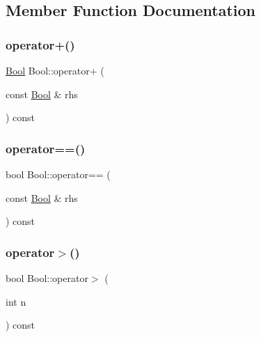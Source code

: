 \subsection{Member Function Documentation}
\mbox{\label{structBool_a6f4ecdec19082e896cffce66e6b6e7cc}} 
\subsubsection{\texorpdfstring{operator+()}{operator+()}}
{\footnotesize\ttfamily \mbox{\hyperlink{structBool}{Bool}} Bool\+::operator+ (\begin{DoxyParamCaption}\item[{const \mbox{\hyperlink{structBool}{Bool}} \&}]{rhs }\end{DoxyParamCaption}) const\hspace{0.3cm}{\ttfamily [inline]}}

\mbox{\label{structBool_afe799a4977c5ebe4c215d5d4ebd77adb}} 
\subsubsection{\texorpdfstring{operator==()}{operator==()}}
{\footnotesize\ttfamily bool Bool\+::operator== (\begin{DoxyParamCaption}\item[{const \mbox{\hyperlink{structBool}{Bool}} \&}]{rhs }\end{DoxyParamCaption}) const\hspace{0.3cm}{\ttfamily [inline]}}

\mbox{\label{structBool_a7baecbc58992eb06157fbbbaa560be0b}} 
\subsubsection{\texorpdfstring{operator$>$()}{operator>()}}
{\footnotesize\ttfamily bool Bool\+::operator$>$ (\begin{DoxyParamCaption}\item[{int}]{n }\end{DoxyParamCaption}) const\hspace{0.3cm}{\ttfamily [inline]}}



